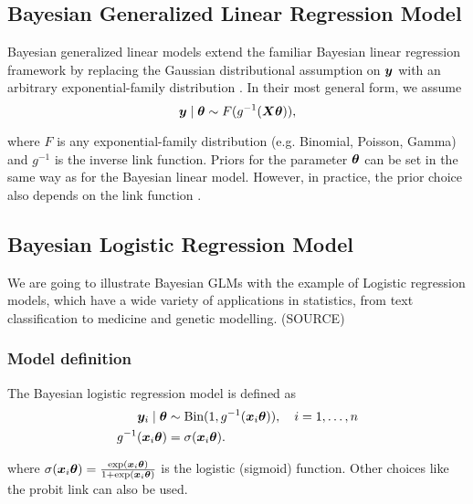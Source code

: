 \subsection{Bayesian Generalized Linear Regression Model}\label{sec:logit-glm}

Bayesian generalized linear models extend the familiar Bayesian linear regression framework by replacing the Gaussian distributional assumption on $\bm{y}$ with an arbitrary exponential-family distribution \citep{nelder_generalized_1972,west_dynamic_1985}. 
In their most general form, we assume
\begin{equation*}
    \bm{y} \mid \bm{\theta} \sim F(g^{-1}(\bm{X} \bm{\theta})),
\end{equation*}

where $F$ is any exponential-family distribution (e.g. Binomial, Poisson, Gamma) and $g^{-1}$ is the inverse link function.
Priors for the parameter $\bm{\theta}$ can be set in the same way as for the Bayesian linear model. However, in practice, the prior choice also depends on the link function \citep{west_dynamic_1985}.

\subsection{Bayesian Logistic Regression Model} \label{sec:logit-logit}

We are going to illustrate Bayesian GLMs with the example of Logistic regression models, which have a wide variety of applications in statistics, from text classification to medicine and genetic modelling. (SOURCE)

\subsubsection*{Model definition}

The Bayesian logistic regression model is defined as
\begin{equation}\label{eq:logit}
    \begin{aligned}
        \bm{y}_i \mid \bm{\theta} &\sim \text{Bin}(1, g^{-1}(\bm{x}_i \bm{\theta})), \quad i = 1, \dots, n \\
        g^{-1}(\bm{x}_i \bm{\theta}) &= \sigma(\bm{x}_i \bm{\theta}).
    \end{aligned}
\end{equation}

where $\sigma(\bm{x}_i \bm{\theta}) = \frac{\exp(\bm{x}_i \bm{\theta})}{1 + \exp(\bm{x}_i \bm{\theta})}$ is the logistic (sigmoid) function.  Other choices like the probit link can also be used.

